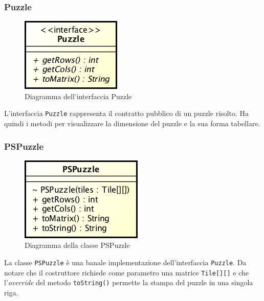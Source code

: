 \documentclass[a4paper, 12pt]{article}
\begin{document}
      \subsubsection{Puzzle}

        \begin{figure}[H]

          \centering
          \includegraphics[scale=0.7]{uml/puzzle.png}
          \caption{Diagramma dell'interfaccia Puzzle}
          \label{uml:puzzle}

        \end{figure}

        L'interfaccia \verb|Puzzle| rappresenta il contratto pubblico di un puzzle risolto. Ha quindi i metodi per visualizzare la dimensione del puzzle e la sua forma tabellare.

      \subsubsection{PSPuzzle}

        \begin{figure}[H]

          \centering
          \includegraphics[scale=0.7]{uml/pspuzzle.png}
          \caption{Diagramma della classe PSPuzzle}
          \label{uml:pspuzzle}

        \end{figure}

        La classe \verb|PSPuzzle| è una banale implementazione dell'interfaccia \verb|Puzzle|. Da notare che il costruttore richiede come parametro una matrice \verb|Tile[][]| e che l'\emph{override} del metodo \verb|toString()| permette la stampa del puzzle in una singola riga.    
\end{document}
